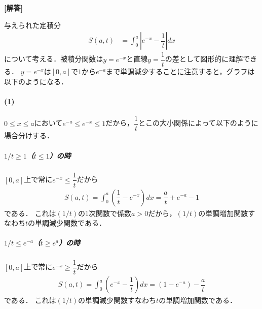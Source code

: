 \documentclass[../../main.tex]{subfiles}
\begin{document}
\begin{oframed}
  
\end{oframed}

{\bf [解答]}

与えられた定積分
\begin{align}
  S(a,t) &= \int_0^a\left|e^{-x}-\dfrac{1}{t}\right|dx \label{eq:1}
\end{align}
について考える．被積分関数は$y=e^{-x}$と直線$y=\dfrac{1}{t}$の差として図形的に理解できる．
$y=e^{-x}$は$[0,a]$で$1$から$e^{-a}$まで単調減少することに注意すると，グラフは以下のようになる．

\paragraph{(1)}
$0 \le x \le a$において$e^{-a} \le e^{-x} \le 1$だから，$\dfrac{1}{t}$とこの大小関係によって以下のように場合分けする．

\subparagraph{$1/t\ge1$（$t\le1$）の時}
$[0,a]$上で常に$e^{-x} \le \dfrac{1}{t}$だから
\begin{align}
  S(a,t)=\int_0^a\left(\dfrac{1}{t}-e^{-x}\right)dx=\dfrac{a}{t}+e^{-a}-1
\end{align}
である．
これは$(1/t)$の1次関数で係数$a>0$だから，$(1/t)$の単調増加関数すなわち$t$の単調減少関数である．

\subparagraph{$1/t\le e^{-a}$（$t\ge e^a$）の時}
$[0,a]$上で常に$e^{-x}\ge \dfrac{1}{t}$だから
\begin{align}
  S(a,t)=\int_0^a\left(e^{-x}-\dfrac{1}{t}\right)dx=(1-e^{-a})-\dfrac{a}{t}
\end{align}
である．
これは$(1/t)$の単調減少関数すなわち$t$の単調増加関数である．
\casesend
\end{document}

